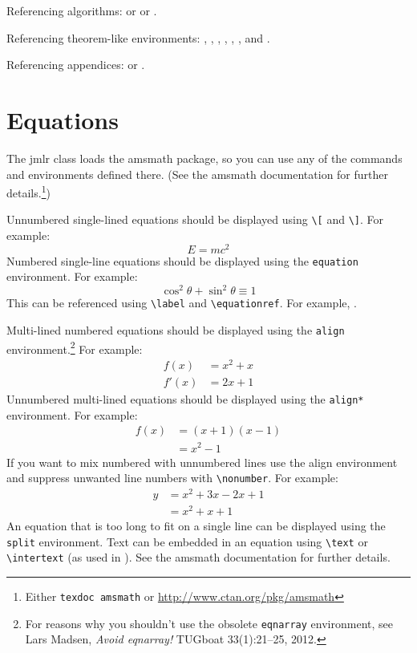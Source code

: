 \documentclass[pmlr]{jmlr}
\begin{document}
Referencing algorithms:  or
 or
.

Referencing theorem-like environments: ,
, , 
, ,
,  and
.

Referencing appendices:  or
.

\section{Equations}
\label{sec:math}

The \textsf{jmlr} class loads the \textsf{amsmath} package, so
you can use any of the commands and environments defined there.
(See the \textsf{amsmath} documentation for further
details.\footnote{Either \texttt{texdoc amsmath} or
\url{http://www.ctan.org/pkg/amsmath}})

Unnumbered single-lined equations should be displayed using
\verb|\[| and \verb|\]|. For example:
\[E = m c^2\]
Numbered single-line equations should be displayed using the
\texttt{equation} environment. For example:
\begin{equation}\label{eq:trigrule}
\cos^2\theta + \sin^2\theta \equiv 1
\end{equation}
This can be referenced using \verb|\label| and \verb|\equationref|.
For example, .

Multi-lined numbered equations should be displayed using the
\texttt{align} environment.\footnote{For reasons why you 
shouldn't use the obsolete \texttt{eqnarray} environment, see
Lars Madsen, \emph{Avoid eqnarray!} TUGboat 33(1):21--25, 2012.} For example:
\begin{align}
f(x) &= x^2 + x\label{eq:f}\\
f'(x) &= 2x + 1\label{eq:df}
\end{align}
Unnumbered multi-lined equations should be displayed using the
\texttt{align*} environment. For example:
\begin{align*}
f(x) &= (x+1)(x-1)\\
&= x^2 - 1
\end{align*}
If you want to mix numbered with unnumbered lines use the
align environment and suppress unwanted line numbers with
\verb|\nonumber|. For example:
\begin{align}
y &= x^2 + 3x - 2x + 1\nonumber\\
&= x^2 + x + 1\label{eq:y}
\end{align}
An equation that is too long to fit on a single line can be
displayed using the \texttt{split} environment. 
Text can be embedded in an equation using \verb|\text| or
\verb|\intertext| (as used in ).
See the \textsf{amsmath} documentation for further details.
\end{document}

